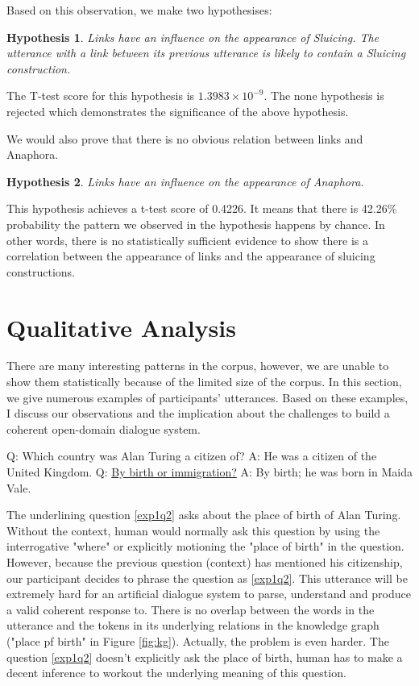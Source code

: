 \documentclass[bsc,frontabs,twoside,singlespacing,parskip,deptreport]{infthesis}     %
\newtheorem{hypo}{Hypothesis}[chapter]
\begin{document}
Based on this observation, we make two hypothesises:

\begin{hypo}
Links have an influence on the appearance of Sluicing. The utterance with a link between its previous utterance is likely to contain a Sluicing construction.
\end{hypo}

The T-test score for this hypothesis is $1.3983 \times 10^{-9}$. The none hypothesis is rejected which demonstrates the significance of the above hypothesis.

We would also prove that there is no obvious relation between links and Anaphora.

\begin{hypo}
Links have an influence on the appearance of Anaphora.
\end{hypo}

This hypothesis achieves a t-test score of 0.4226. It means that there is 42.26\% probability the pattern we observed in the hypothesis happens by chance. In other words, there is no statistically sufficient evidence to show there is a correlation between the appearance of links and the appearance of sluicing constructions.

\section{Qualitative Analysis}

There are many interesting patterns in the corpus, however, we are unable to show them statistically because of the limited size of the corpus. In this section, we give numerous examples of participants' utterances. Based on these examples, I discuss our observations and the implication about the challenges to build a coherent open-domain dialogue system.

\begin{exe}
	\ex
		\begin{xlist}
			\ex \label{exp1q1} Q: Which country was Alan Turing a citizen of?
			\ex \label{exp1a1} A: He was a citizen of the United Kingdom.
			\ex \label{exp1q2} Q: \underline{By birth or immigration?}
			\ex \label{exp1a2} A: By birth; he was born in Maida Vale.
	\end{xlist}
\end{exe}

The underlining question \ref{exp1q2} asks about the place of birth of Alan Turing. Without the context, human would normally ask this question by using the interrogative "where" or explicitly motioning the "place of birth" in the question. However, because the previous question (context) has mentioned his citizenship, our participant decides to phrase the question as \ref{exp1q2}. This utterance will be extremely hard for an artificial dialogue system to parse, understand and produce a valid coherent response to. There is no overlap between the words in the utterance and the tokens in its underlying relations in the knowledge graph ("place pf birth" in Figure \ref{fig:kg}). Actually, the problem is even harder. The question \ref{exp1q2} doesn't explicitly ask the place of birth, human has to make a decent inference to workout the underlying meaning of this question.
\end{document}
